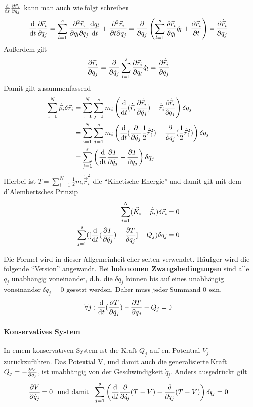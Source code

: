 $\frac{\mathrm d}{\mathrm d t} \frac{\partial \vec{r}_i}{\partial q_j}$ kann man auch wie folgt schreiben 
$$\frac{\mathrm d}{\mathrm d t} \frac{\partial \vec{r}_i}{\partial q_j} = \sum_{l=1}^s \frac{\partial^2 \vec{r}_i}{\partial q_l \partial q_j} \frac{\mathrm d q_l}{\mathrm d t} + \frac{\partial^2 \vec{r}_i}{\partial t \partial q_j} = \frac{\partial}{\partial q_j} \left( \sum_{l=1}^s \frac{\partial \vec{r}_i}{\partial q_l} \dot{q}_l + \frac{\partial \vec{r}_i}{\partial t}\right) = \frac{\partial \dot{\vec{r}}_i}{\partial q_j}$$
Außerdem gilt
$$\frac{\partial \vec{r}_i}{\partial q_j} = \frac{\partial}{\partial \dot q_j} \sum_{l = 1}^s \frac{\partial \vec{r}_i}{\partial q_l} \dot{q}_l = \frac{\partial \dot{\vec{r}}_i}{\partial \dot{q}_j}$$
Damit gilt zusammenfassend
\begin{align*}
\sum_{i = 1}^N \dot{\vec{p}}_i \delta \vec{r}_i &= \sum_{i=1}^N \sum_{j = 1}^s m_i \left( \frac{\mathrm d}{\mathrm d t} (\dot{\vec{r}}_i  \frac{\partial \dot{\vec{r}}_i}{\partial \dot{q}_j})  -\dot{\vec{r}}_i \frac{\partial \dot{\vec{r}}_i}{\partial q_j} \right) \delta q_j\\ 
&= \sum_{i=1}^N\sum_{j=1}^s m_i \left(  \frac{\mathrm d}{\mathrm d t} (\frac{\partial}{\partial \dot q_j} \frac12 \dot{\vec{r}}_i^2) -\frac{\partial}{\partial q_j} (\frac12 \dot{\vec{r}}_i^2) \right) \delta q_j \\
&= \sum_{j = 1}^s \left( \frac{\mathrm d}{\mathrm d t} \frac{\partial T}{\partial \dot{q}_j} - \frac{\partial T}{\partial q_j} \right) \delta q_j
\end{align*}
Hierbei ist $T = \sum_{i = 1}^{N} \frac12 m_i \dot{\vec{r}}_i^2$ die "`Kinetische Energie"'
und damit gilt mit dem d'Alembertsches Prinzip
\begin{align*}
- \sum_{i = 1}^{N} (\vec{K}_i - \dot{\vec{p}}_i) \delta \vec{r}_i &= 0\\
\sum_{j = 1}^s( [\frac{\mathrm d}{\mathrm d t} ( \frac{\partial T}{\partial \dot{q}_j}) - \frac{\partial T}{\partial q_j}] - Q_j ) \delta q_j &= 0
\end{align*}

Die Formel wird in dieser Allgemeinheit eher selten verwendet. Häufiger wird die folgende "`Version"' angewandt. Bei \textbf{holonomen Zwangsbedingungen} sind alle $q_j$ unabhängig voneinander, d.h. die $\delta q_j$  können bis auf eines unabhängig voneinander $\delta q_j = 0$ gesetzt werden. Daher muss jeder Summand 0 sein.
$$\forall j:  \frac{\mathrm d}{\mathrm d t} ( \frac{\partial T}{\partial \dot{q}_j}) - \frac{\partial T}{\partial q_j} - Q_j = 0$$

\paragraph{Konservatives System}
In einem konservativen System ist die Kraft $Q_j$ auf ein Potential $V_j$ zurückzuführen. Das Potential V, und damit auch die generalisierte Kraft $Q_j = - \frac{\partial V}{\partial q_j}$, ist unabhängig von der Geschwindigkeit $\dot{q}_j$. Anders ausgedrückt gilt
$$\frac{\partial V}{\partial \dot q_j} = 0 \text{~ und damit ~} \sum_{j=1}^s \left(  \frac{\mathrm d}{\mathrm d t} \frac{\partial}{\partial \dot{q}_j} (T-V) - \frac{\partial}{\partial q_j} (T -V) \right) \delta q_j = 0$$


